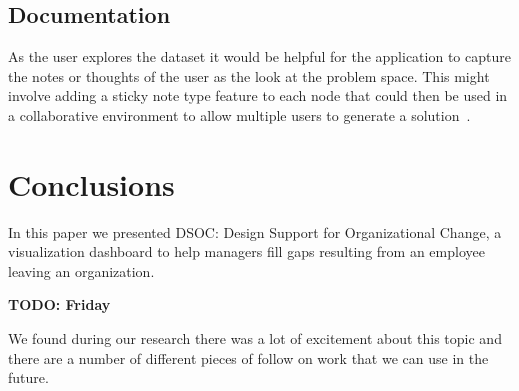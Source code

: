 \documentclass[journal]{vgtc}                %
\begin{document}
\subsection{Documentation}

As the user explores the dataset it would be helpful for the application to capture the notes or thoughts of the user as the look at the problem space.  This might involve adding a sticky note type feature to each node that could then be used in a collaborative environment to allow multiple users to generate a solution~\cite{ware2012information}.

\section{Conclusions}
\label{sec:conclusions}

In this paper we presented DSOC: Design Support for Organizational Change, a visualization dashboard to help managers fill gaps resulting from an employee leaving an organization.

\textbf{{\color{Plum} TODO: Friday}}

We found during our research there was a lot of excitement about this topic and there are a number of different pieces of follow on work that we can use in the future.




\end{document}
